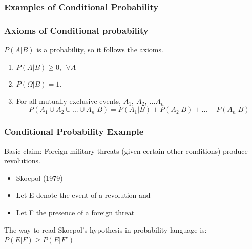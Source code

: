 \documentclass{beamer}
\numberwithin{equation}{section}
\begin{document}
\begin{frame}
\frametitle{Examples of Conditional Probability} 

\end{frame}




\begin{frame}
\frametitle{Axioms of Conditional probability}
$P(A|B)$ is a probability, so it follows the axioms.
\begin{enumerate}
\item $P(A|B)\geq 0, \ \ \forall A$
\item $P(\Omega|B)=1$.
\item For all mutually exclusive events, $A_1,\ A_2,\ ... A_n$
$$P(A_1\cup A_2 \cup...\cup A_n|B)= P(A_1|B)+P(A_2|B)+...+ P(A_n|B)$$
\end{enumerate}
\end{frame}

\begin{frame}
\frametitle{Conditional Probability Example}
Basic claim: Foreign military threats (given certain other conditions) produce revolutions.
\begin{itemize}
\item Skocpol (1979)
\item Let E denote the event of a revolution and
\item Let F the presence of a foreign threat 
\end{itemize}
The way to read Skocpol's hypothesis in probability language is:\\
$P(E|F)\geq P(E|F^c)$

\end{frame}
\end{document}
